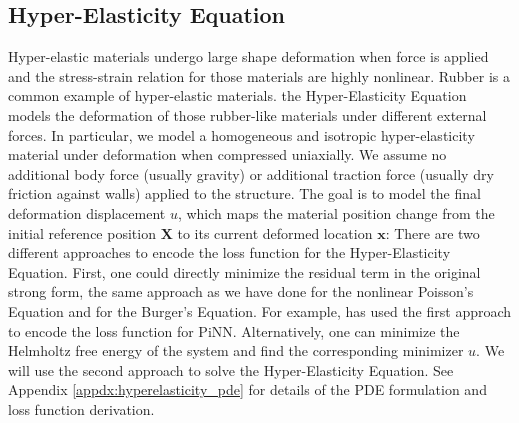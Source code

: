\subsection{Hyper-Elasticity Equation}
Hyper-elastic materials undergo large shape deformation when force is applied and the stress-strain relation for those materials are highly nonlinear. Rubber is a common example of hyper-elastic materials. the Hyper-Elasticity Equation models the deformation of those rubber-like materials under different external forces. In particular, we model a homogeneous and isotropic hyper-elasticity material under deformation when compressed uniaxially. We assume no additional body force (usually gravity) or additional traction force (usually dry friction against walls) applied to the structure. The goal is to model the final deformation displacement $u$, which maps the material position change from the initial reference position $\mathbf{X}$ to its current deformed location $\bm{x}$:
There are two different approaches to encode the loss function for the Hyper-Elasticity Equation. First, one could directly minimize the residual term in the original strong form, the same approach as we have done for the nonlinear Poisson's Equation and for the Burger's Equation. For example, \citet{abueidda2021meshless} has used the first approach to encode the loss function for PiNN. Alternatively, one can minimize the Helmholtz free energy of the system and find the corresponding minimizer $u$. We will use the second approach to solve the Hyper-Elasticity Equation. See Appendix \ref{appdx:hyperelasticity_pde} for details of the PDE formulation and loss function derivation.


